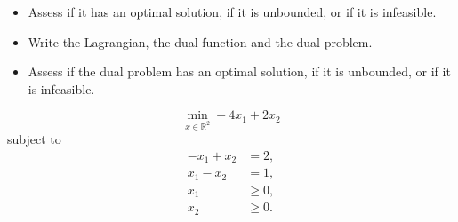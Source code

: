 

\begin{itemize}
\item Assess if it has an optimal solution, if it is unbounded, or if it
  is infeasible.
\item Write the Lagrangian, the dual function and the dual problem.
\item Assess if the dual problem  has an optimal solution, if it is unbounded, or if it  is infeasible.
\end{itemize}

$$\min_{x \in \mathbb{R}^2} -4x_1+2x_2$$
subject to 
\begin{align*}
-x_1 + x_2 & = 2,\\
x_1-x_2 & = 1,\\
x_1 & \geq 0,\\
x_2 & \geq 0.
\end{align*}

